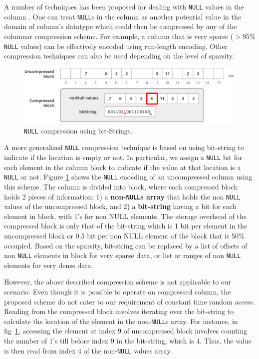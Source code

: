 A number of techniques has been proposed for dealing with \texttt{NULL} values in the column \cite{abadi-sparse-col}. One can treat \texttt{NULL}s in the column as another potential value in the domain of column's datatype which could then be compressed by any of the columnar compression scheme. For example, a column that is very sparse ($>95\%$ \texttt{NULL} values) can be effectively encoded using run-length encoding. Other compression techniques can also be used depending on the level of sparsity.

\begin{figure}
	\vspace{-20pt}
	\hfill\includegraphics[scale=0.70]{img/null1}\hspace*{\fill}
	\captionsetup{justification=centering}
	\caption{\texttt{NULL} compression using bit-Strings.}
	\label{fig:null1}
	\vspace{-5pt}
\end{figure}

A more generalized \texttt{NULL} compression technique is based on using bit-string to indicate if the location is empty or not. In particular, we assign a \texttt{NULL} bit for each element in the column block to indicate if the value at that location is a \texttt{NULL} or not. Figure \ref{fig:null1} shows the \texttt{NULL} enocding of an uncompressed column using this scheme. The column is divided into block, where each compressed block holds 2 pieces of information: 1) a \textbf{non-\texttt{NULL}s array} that holds the non \texttt{NULL} values of the uncompressed block, and 2) a \textbf{bit-string} having a bit for each element in block, with 1's for non NULL elements. The storage overhead of the compressed block is only that of the bit-string which is 1 bit per element in the uncompressed block or 0.5 bit per non NULL element of the block that is 50\% occupied. Based on the sparsity, bit-string can be replaced by a list of offsets of non \texttt{NULL} elements in block for very sparse data, or list or ranges of non \texttt{NULL} elements for very dense data.

However, the above described compression scheme is not applicable to our scenario. Even though it is possible to operate on compressed column, the proposed scheme do not cater to our requirement of constant time random access. Reading from the compressed block involves iterating over the bit-string to calculate the location of the element in the non-\texttt{NULL}s array. For instance, in fig~\ref{fig:null1}, accessing the element at index 9 of uncompressed block involves counting the number of 1's till before index 9 in the bit-string, which is 4. Thus, the value is then read from index 4 of the non-\texttt{NULL} values array.

